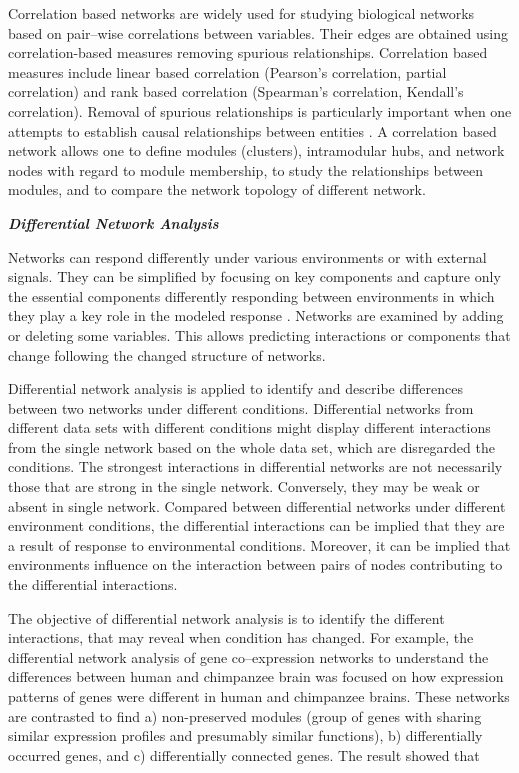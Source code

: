 Correlation based networks are widely used for studying biological networks based on pair--wise correlations between variables. Their edges are obtained using correlation-based measures removing spurious relationships. Correlation based measures include linear based correlation (Pearson's correlation, partial correlation) and rank based correlation (Spearman's correlation, Kendall's correlation). Removal of spurious relationships is particularly important when one attempts to establish causal relationships between entities \citep{Toubiana:2013cv}. A correlation based network allows one to define modules (clusters), intramodular hubs, and network nodes with regard to module membership, to study the relationships between modules, and to compare the network topology of different network. 

\textbf{\textit{Differential Network Analysis}}

Networks can respond differently under various environments or with external signals. They can be simplified by focusing on key components and capture only the essential components differently responding between environments in which they play a key role in the modeled response \citep{Peer:2011jd}. Networks are examined by adding or deleting some variables. This allows predicting interactions or components that change following the changed structure of networks. 

Differential network analysis is applied to identify and describe differences between two networks under different conditions. Differential networks from different data sets with different conditions might display different interactions from the single network based on the whole data set, which are disregarded the conditions. The strongest interactions in differential networks are not necessarily those that are strong in the single network. Conversely, they may be weak or absent in single network. Compared between differential networks under different environment conditions, the differential interactions can be implied that they are a result of response to environmental conditions. Moreover, it can be implied that environments influence on the interaction between pairs of nodes contributing to the differential interactions. 

The objective of differential network analysis is to identify the different interactions, that may reveal when condition has changed. For example, the differential network analysis of gene co--expression networks to understand the differences between human and chimpanzee brain was focused on how expression patterns of genes were different in human and chimpanzee brains. These networks are contrasted to find a) non-preserved modules (group of genes with sharing similar expression profiles and presumably similar functions), b) differentially occurred genes, and c) differentially connected genes. The result showed that 

